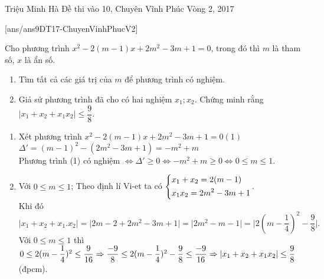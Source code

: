 \begin{name}
{Triệu Minh Hà}
{Đề thi vào 10, Chuyên Vĩnh Phúc Vòng 2, 2017}
\end{name}
\setcounter{ex}{0}
[ans/ans9DT17-ChuyenVinhPhucV2]
\begin{ex}%
 Cho phương trình $x^2-2(m-1)x+2m^2-3m+1=0$, trong đó thì $m$ là tham số, $x$ là ẩn số.
 	\begin{enumerate}
 		\item Tìm tất cả các giá trị của $m$ để phương trình có nghiệm.
 		\item Giả sử phương trình đã cho có hai nghiệm $x_1;x_2$. Chứng minh rằng $ \vert x_1+x_2+x_1x_2\vert \leq \dfrac{9}{8} $.
 	\end{enumerate}
\loigiai
    {\begin{enumerate}
    		\item Xét phương trình $x^2-2(m-1)x+2m^2-3m+1=0 (1)$\\
    		$\Delta'=(m-1)^2-(2m^2-3m+1)=-m^2+m$\\
    		Phương trình (1) có nghiệm $\Leftrightarrow	\Delta'\geq 0\Leftrightarrow -m^2+m\geq 0\Leftrightarrow 0\leq m\leq 1$.
    		\item  Với $0\leq m\leq 1$;
    		Theo định lí Vi-et ta có $\left\{\begin{aligned}& x_1+x_2=2(m-1)\\&x_1x_2=2m^2-3m+1\end{aligned}\right.$.\\
    		Khi đó $\vert x_1+x_2+x_1.x_2\vert=\vert 2m-2+2m^2-3m+1 \vert=\vert 2m^2-m-1\vert=\vert 2(m-\dfrac{1}{4})^2-\dfrac{9}{8}\vert. $\\
    		Với $0\leq m\leq 1$ thì $ 0\leq2(m-\dfrac{1}{4})^2\leq \dfrac{9}{16}\\\Rightarrow \dfrac{-9}{8}\leq 2(m-\dfrac{1}{4})^2-\dfrac{9}{8}\leq \dfrac{-9}{16}\Rightarrow \vert x_1+x_2+x_1x_2\vert \leq \dfrac{9}{8} $ (đpcm).
    	\end{enumerate}
    	
    }
\end{ex}

